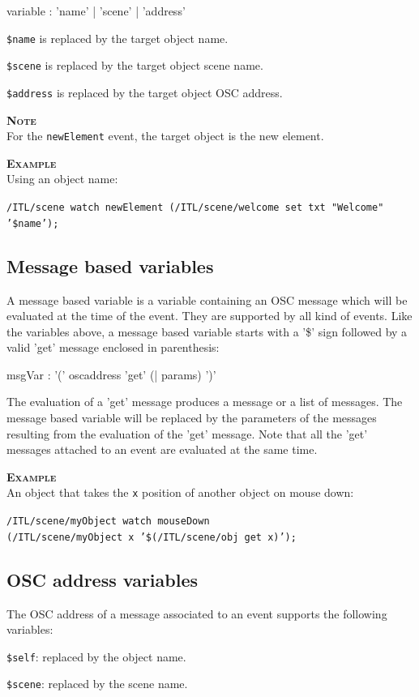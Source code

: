 \documentclass[a4paper,twoside]{report}
\newcommand{\subsublevel}[1]	{\subsection{#1}}
\newcommand{\OSC}[1]		{\texttt{#1}}
\newcommand{\values}[1]		{\texttt{#1}}
\newcommand{\example}		{\textbf{\hspace{-1.5cm}\textbf{\textsc{Example }}}}
\newcommand{\note}	[1]		{\vspace{2mm}\textbf{\hspace{-1.03cm}\textbf{\textsc{Note #1}}}}
\let\olditemize\itemize
\let\oldenditemize\enditemize
\renewenvironment{itemize} 	{\olditemize \setlength{\itemsep}{1mm}}{\oldenditemize}
\newcommand{\sample}	[1]			{\vspace{-2mm}\begin{center}\colorbox{mygrey}{
								\begin{minipage}[t]{0.9\columnwidth} 
								{\small \texttt{#1}}
								\end{minipage}}\end{center}}
\begin{document}
\begin{rail} 
variable :  'name' | 'scene' | 'address'
\end{rail}

\begin{itemize}
\item \OSC{\$name} is replaced by the target object name.
\item \OSC{\$scene} is replaced by the target object scene name.
\item \OSC{\$address} is replaced by the target object OSC address. 
\end{itemize}

\note{} \\
For the \OSC{newElement} event, the target object is the new element. 

\example \\
Using an object name:
\sample{/ITL/scene watch newElement (/ITL/scene/welcome set txt "Welcome" '\$name');}

\subsublevel{Message based variables}
\label{msgvar}

A message based variable is a variable containing an OSC message which will be evaluated at the time of the event. They are supported by all kind of events. Like  the variables above, a message based variable starts with a '\$' sign followed by a valid 'get' message enclosed in parenthesis:
\begin{rail} 
msgVar : '(' oscaddress 'get' (| params) ')'
\end{rail}

The evaluation of a 'get' message produces a message or a list of messages. The message based variable will be replaced by the parameters of the messages resulting from the evaluation of the 'get' message.
Note that all the 'get' messages attached to an event are evaluated at the same time.

\example \\
An object that takes the \values{x} position of another object on mouse down:
\sample{/ITL/scene/myObject watch mouseDown \\
\hspace*{3cm}(/ITL/scene/myObject x '\$(/ITL/scene/obj get x)');}


\subsublevel{OSC address variables}
\label{oscvar}
The OSC address of a message associated to an event supports the following variables:
\begin{itemize}
\item \OSC{\$self}: replaced by the object name.
\item \OSC{\$scene}: replaced by the scene name.
\end{itemize}
\end{document}
